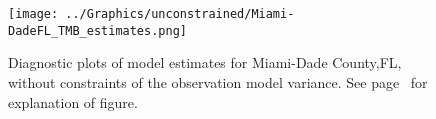 \documentclass[12pt,letterpaper]{article}
\begin{document}
\begin{appendices}
\begin{figure}
\begin{center}
\texttt{[image: ../Graphics/unconstrained/Miami-DadeFL\_TMB\_estimates.png]}
\end{center}
\caption{\label{fig:estsMDFLu}
Diagnostic plots of model estimates for Miami-Dade County,FL,
without constraints of the observation model variance. 
See page~\pageref{pp:diagexpl} for explanation of figure.
}
\end{figure}

\end{appendices}
\end{document}
